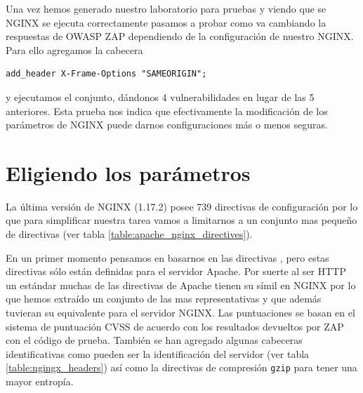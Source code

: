 \bigskip
Una vez hemos generado nuestro laboratorio para pruebas y viendo que se NGINX se ejecuta correctamente pasamos a probar como va cambiando la respuestas de OWASP ZAP dependiendo de la configuración de nuestro NGINX. Para ello agregamos la cabecera \begin{verbatim}add_header X-Frame-Options "SAMEORIGIN";\end{verbatim} y ejecutamos el conjunto, dándonos 4 vulnerabilidades en lugar de las 5 anteriores. Esta prueba nos indica que efectivamente la modificación de los parámetros de NGINX puede darnos configuraciones más o menos seguras.

\section{Eligiendo los parámetros}

La última versión de NGINX (1.17.2) posee 739 directivas de configuración por lo que para simplificar nuestra tarea vamos a limitarnos a un conjunto mas pequeño de directivas (ver tabla \ref{table:apache_nginx_directives}).

\bigskip
En un primer momento pensamos en basarnos en las directivas , pero estas directivas sólo están definidas para el servidor Apache. Por suerte al ser HTTP un estándar muchas de las directivas de Apache tienen su símil en NGINX por lo que hemos extraído un conjunto de las mas representativas y que además tuvieran su equivalente para el servidor NGINX. Las puntuaciones se basan en el sistema de puntuación CVSS de acuerdo con los resultados devueltos por ZAP con el código de prueba. También se han agregado algunas cabeceras identificativas como pueden ser la identificación del servidor (ver tabla \ref{table:ngingx_headers}) así como la directivas de compresión \texttt{gzip} para tener una mayor entropía.

